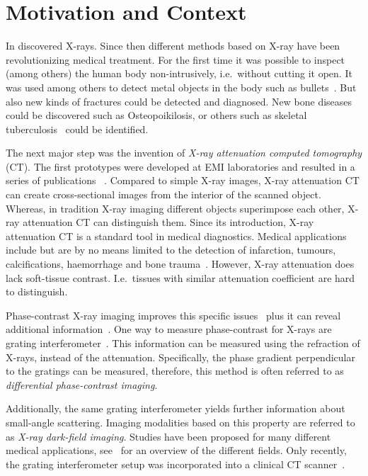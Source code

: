 \chapter{Motivation and Context}\label{chap:introduction}

In \citeyear{rontgen_uber_1895} \citeauthor{rontgen_uber_1895} discovered X-rays. Since then
different methods based on X-ray have been revolutionizing medical treatment. For the first time it
was possible to inspect (among others) the human body non-intrusively, i.e.\ without cutting it
open. It was used among others to detect metal objects in the body such as
bullets~\cite{haygood_skeletal_1996}. But also new kinds of fractures could be detected and
diagnosed. New bone diseases could be discovered such as Osteopoikilosis, or others such as skeletal
tuberculosis~\cite{haygood_skeletal_1996} could be identified.

The next major step was the invention of \textit{X-ray attenuation computed tomography} (CT). The
first prototypes were developed at EMI laboratories and resulted in a series of publications
~\cite{hounsfield_computerized_1973,ambrose_computerized_1973, perry_computerized_1973}. Compared to
simple X-ray images, X-ray attenuation CT can create cross-sectional images from the interior of the
scanned object. Whereas, in tradition X-ray imaging different objects superimpose each other, X-ray
attenuation CT can distinguish them. Since its introduction, X-ray attenuation CT is a standard tool
in medical diagnostics. Medical applications include but are by no means limited to the detection of
infarction, tumours, calcifications, haemorrhage and bone trauma~\cite[Chapter 5]{buchanan_advanced_2012}.
However, X-ray attenuation does lack soft-tissue contrast\cite{pfeiffer_phase_2006}. I.e.\
tissues with similar attenuation coefficient are hard to distinguish.

Phase-contrast X-ray imaging improves this specific issues~\cite{lewis_medical_2004} plus it can
reveal additional information~\cite{hahn_numerical_2012}. One way to measure phase-contrast for
X-rays are grating interferometer~\cite{pfeiffer_hard-x-ray_2008}. This information can be measured
using the refraction of X-rays, instead of the attenuation. Specifically, the phase gradient
perpendicular to the gratings can be measured, therefore, this method is often referred to as
\textit{differential phase-contrast imaging}.

Additionally, the same grating interferometer yields further information about small-angle
scattering. Imaging modalities based on this property are referred to as \textit{X-ray dark-field
	imaging}. Studies have been proposed for many different medical applications, see~\cite[Chapter
	1.3.1]{wieczorek_anisotropic_2017} for an overview of the different fields. Only recently, the
grating interferometer setup was incorporated into a clinical CT
scanner~\cite{viermetz_dark-field_2022}.

